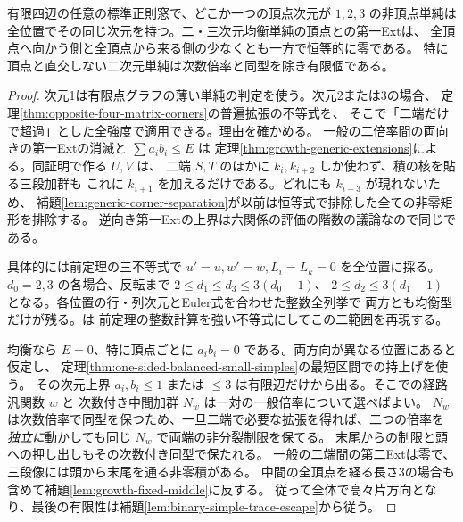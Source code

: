 \begin{theorem}\label{thm:generic-corner-small-simples}
有限四辺の任意の標準正則窓で、どこか一つの頂点次元が $1,2,3$ の非頂点単純は
全位置でその同じ次元を持つ。二・三次元均衡単純の頂点との第一Extは、
全頂点へ向かう側と全頂点から来る側の少なくとも一方で恒等的に零である。
特に頂点と直交しない二次元単純は次数倍率と同型を除き有限個である。
\end{theorem}
\begin{proof}
次元1は有限点グラフの薄い単純の判定を使う。次元2または3の場合、
定理\ref{thm:opposite-four-matrix-corners}の普遍拡張の不等式を、
そこで「二端だけで超過」とした全強度で適用できる。理由を確かめる。
一般の二倍率間の両向きの第一Extの消滅と $\sum a_i b_i\le E$ は
定理\ref{thm:growth-generic-extensions}による。同証明で作る $U,V$ は、
二端 $S,T$ のほかに $k_i,k_{i+2}$ しか使わず、積の核を貼る三段加群も
これに $k_{i+1}$ を加えるだけである。どれにも $k_{i+3}$ が現れないため、
補題\ref{lem:generic-corner-separation}が以前は恒等式で排除した全ての非零矩形を排除する。
逆向き第一Extの上界は六関係の評価の階数の議論なので同じである。

具体的には前定理の三不等式で $u'=u,w'=w,L_i=L_k=0$ を全位置に採る。
$d_0=2,3$ の各場合、反転まで $2\le d_1\le d_3\le3(d_0-1)$、
$2\le d_2\le3(d_1-1)$ となる。各位置の行・列次元とEuler式を合わせた整数全列挙で
両方とも均衡型だけが残る。は
前定理の整数計算を強い不等式にしてこの二範囲を再現する。

均衡なら $E=0$、特に頂点ごとに $a_i b_i=0$ である。両方向が異なる位置にあると仮定し、
定理\ref{thm:one-sided-balanced-small-simples}の最短区間での持上げを使う。
その次元上界 $a_i,b_i\le1$ または $\le3$ は有限辺だけから出る。そこでの経路汎関数 $w$ と
次数付き中間加群 $N_w$ は一対の一般倍率について選べばよい。
$N_w$ は次数倍率で同型を保つため、一旦二端で必要な拡張を得れば、二つの倍率を
\emph{独立に}動かしても同じ $N_w$ で両端の非分裂制限を保てる。
末尾からの制限と頭への押し出しもその次数付き同型で保たれる。
一般の二端間の第二Extは零で、三段像には頭から末尾を通る非零積がある。
中間の全頂点を経る長さ3の場合も含めて補題\ref{lem:growth-fixed-middle}に反する。
従って全体で高々片方向となり、最後の有限性は補題\ref{lem:binary-simple-trace-escape}から従う。
\end{proof}

